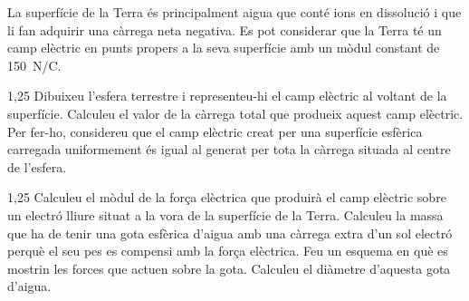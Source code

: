 La superfície de la Terra és principalment aigua que conté ions en dissolució i que li fan adquirir una càrrega neta negativa. Es pot considerar que la Terra té un camp elèctric en punts propers a la seva superfície amb un mòdul constant de 150~N/C.

\begin{apartat}{1,25}
Dibuixeu l'esfera terrestre i representeu-hi el camp elèctric al voltant de la superfície. Calculeu el valor de la càrrega total que produeix aquest camp elèctric. Per fer-ho, considereu que el camp elèctric creat per una superfície esfèrica carregada uniformement és igual al generat per tota la càrrega situada al centre de l'esfera.
\end{apartat}

\begin{apartat}{1,25}
Calculeu el mòdul de la força elèctrica que produirà el camp elèctric sobre un electró lliure situat a la vora de la superfície de la Terra. Calculeu la massa que ha de tenir una gota esfèrica d'aigua amb una càrrega extra d'un sol electró perquè el seu pes es compensi amb la força elèctrica. Feu un esquema en què es mostrin les forces que actuen sobre la gota. Calculeu el diàmetre d'aquesta gota d'aigua.
\end{apartat}


